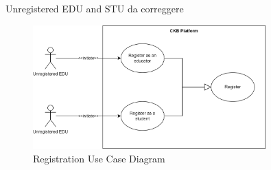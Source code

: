 {\color{red} Unregistered EDU and STU da correggere}
\begin{figure}[H]
    \centering
    \includegraphics[width=0.8\textwidth]{images/sequence_diagrams/use_case_diagrams_registration.png}
    \caption{Registration Use Case Diagram}
\end{figure}

